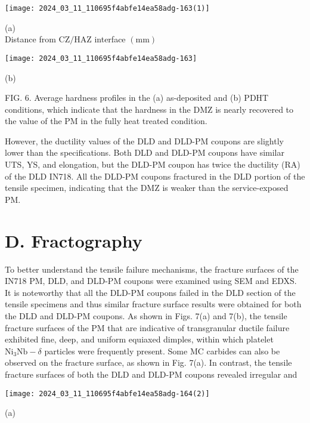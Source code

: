 \documentclass[10pt]{article}
\begin{document}
\begin{center}
\texttt{[image: 2024\_03\_11\_110695f4abfe14ea58adg-163(1)]}
\end{center}

(a)\\
Distance from $\mathrm{CZ} / \mathrm{HAZ}$ interface $(\mathrm{mm})$

\begin{center}
\texttt{[image: 2024\_03\_11\_110695f4abfe14ea58adg-163]}
\end{center}

(b)

FIG. 6. Average hardness profiles in the (a) as-deposited and (b) PDHT conditions, which indicate that the hardness in the DMZ is nearly recovered to the value of the PM in the fully heat treated condition.

However, the ductility values of the DLD and DLD-PM coupons are slightly lower than the specifications. Both DLD and DLD-PM coupons have similar UTS, YS, and elongation, but the DLD-PM coupon has twice the ductility (RA) of the DLD IN718. All the DLD-PM coupons fractured in the DLD portion of the tensile specimen, indicating that the DMZ is weaker than the service-exposed PM.

\section*{D. Fractography}
To better understand the tensile failure mechanisms, the fracture surfaces of the IN718 PM, DLD, and DLD-PM coupons were examined using SEM and EDXS. It is noteworthy that all the DLD-PM coupons failed in the DLD section of the tensile specimens and thus similar fracture surface results were obtained for both the DLD and DLD-PM coupons. As shown in Figs. 7(a) and 7(b), the tensile fracture surfaces of the PM that are indicative of transgranular ductile failure exhibited fine, deep, and uniform equiaxed dimples, within which platelet $\mathrm{Ni}_{3} \mathrm{Nb}-\delta$ particles were frequently present. Some MC carbides can also be observed on the fracture surface, as shown in Fig. 7(a). In contrast, the tensile fracture surfaces of both the DLD and DLD-PM coupons revealed irregular and

\begin{center}
\texttt{[image: 2024\_03\_11\_110695f4abfe14ea58adg-164(2)]}
\end{center}

(a)
\end{document}
